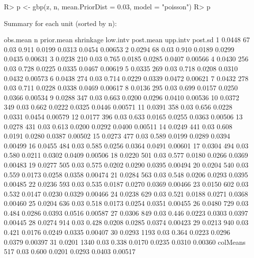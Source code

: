 \documentclass[article]{jss}
\begin{document}
\begin{CodeChunk}
\begin{CodeInput}
R> p <- gbp(z, n, mean.PriorDist = 0.03, model = "poisson")
R> p
\end{CodeInput}
\begin{CodeOutput}
Summary for each unit (sorted by n):

         obs.mean    n prior.mean shrinkage low.intv post.mean upp.intv post.sd
1          0.0448   67       0.03     0.911   0.0199    0.0313   0.0454 0.00653
2          0.0294   68       0.03     0.910   0.0189    0.0299   0.0435 0.00631
3          0.0238  210       0.03     0.765   0.0185    0.0285   0.0407 0.00566
4          0.0430  256       0.03     0.728   0.0225    0.0335   0.0467 0.00619
5          0.0335  269       0.03     0.718   0.0208    0.0310   0.0432 0.00573
6          0.0438  274       0.03     0.714   0.0229    0.0339   0.0472 0.00621
7          0.0432  278       0.03     0.711   0.0228    0.0338   0.0469 0.00617
8          0.0136  295       0.03     0.699   0.0157    0.0250   0.0366 0.00534
9          0.0288  347       0.03     0.663   0.0200    0.0296   0.0410 0.00536
10         0.0372  349       0.03     0.662   0.0222    0.0325   0.0446 0.00571
11         0.0391  358       0.03     0.656   0.0228    0.0331   0.0454 0.00579
12         0.0177  396       0.03     0.633   0.0165    0.0255   0.0363 0.00506
13         0.0278  431       0.03     0.613   0.0200    0.0292   0.0400 0.00511
14         0.0249  441       0.03     0.608   0.0191    0.0280   0.0387 0.00502
15         0.0273  477       0.03     0.589   0.0199    0.0289   0.0394 0.00499
16         0.0455  484       0.03     0.585   0.0256    0.0364   0.0491 0.00601
17         0.0304  494       0.03     0.580   0.0211    0.0302   0.0409 0.00506
18         0.0220  501       0.03     0.577   0.0180    0.0266   0.0369 0.00483
19         0.0277  505       0.03     0.575   0.0202    0.0290   0.0395 0.00494
20         0.0204  540       0.03     0.559   0.0173    0.0258   0.0358 0.00474
21         0.0284  563       0.03     0.548   0.0206    0.0293   0.0395 0.00485
22         0.0236  593       0.03     0.535   0.0187    0.0270   0.0369 0.00466
23         0.0150  602       0.03     0.532   0.0147    0.0230   0.0329 0.00466
24         0.0238  629       0.03     0.521   0.0188    0.0271   0.0368 0.00460
25         0.0204  636       0.03     0.518   0.0173    0.0254   0.0351 0.00455
26         0.0480  729       0.03     0.484   0.0286    0.0393   0.0516 0.00587
27         0.0306  849       0.03     0.446   0.0223    0.0303   0.0397 0.00445
28         0.0274  914       0.03     0.428   0.0208    0.0285   0.0374 0.00423
29         0.0213  940       0.03     0.421   0.0176    0.0249   0.0335 0.00407
30         0.0293 1193       0.03     0.364   0.0223    0.0296   0.0379 0.00397
31         0.0201 1340       0.03     0.338   0.0170    0.0235   0.0310 0.00360
colMeans           517       0.03     0.600   0.0201    0.0293   0.0403 0.00517
\end{CodeOutput}
\end{CodeChunk}
\end{document}
